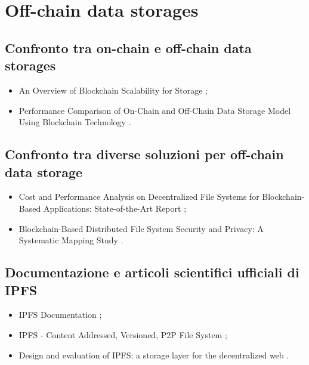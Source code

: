 \section*{Off-chain data storages}

\subsection*{Confronto tra on-chain e off-chain data storages}
\begin{itemize}

\item An Overview of Blockchain Scalability for Storage \cite{gong2023onoffchain};

\item Performance Comparison of On-Chain and Off-Chain Data Storage Model Using Blockchain Technology \cite{priya2023onoffchain}.

\end{itemize}

\subsection*{Confronto tra diverse soluzioni per off-chain data storage}
\begin{itemize}

\item Cost and Performance Analysis on Decentralized File Systems for Blockchain-Based Applications: State-of-the-Art Report \cite{ismail2022offchain};

\item Blockchain-Based Distributed File System Security and Privacy: A Systematic Mapping Study \cite{mohtar2022offchain}.

\end{itemize}

\subsection*{Documentazione e articoli scientifici ufficiali di IPFS}
\begin{itemize}

\item IPFS Documentation \cite{ipfs2024doc};

\item IPFS - Content Addressed, Versioned, P2P File System \cite{benet2014ipfs};

\item Design and evaluation of IPFS: a storage layer for the decentralized web \cite{trautwein2023ipfs}.

\end{itemize}

